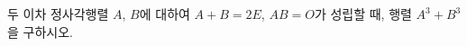 \hspace*{2mm}\begin{minipage}[t]{\dimexpr\linewidth-2mm\relax}\vspace{0pt}
두 이차 정사각행렬 $A$, $B$에 대하여 $A+B=2E$, $AB=O$가 성립할 때, 행렬 $A^3+B^3$을 구하시오.\end{minipage}
